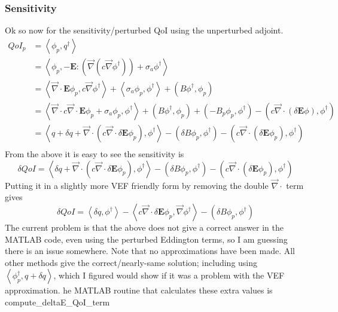 \documentclass{article}
\newcommand{\bra}{\left\langle}
\newcommand{\ket}{\right\rangle}
\newcommand{\vdiv}{\vec{\nabla} \cdot}
\newcommand{\vgrad}{\vec{\nabla}}
\newcommand{\Edd}{\mathbf{E}}
\newcommand{\siga}{\sigma_a}
\newcommand{\isigt}{c}
\newcommand{\scalSource}{q}
\newcommand{\scalResp}{q^\dag}
\newcommand{\qoi}{QoI}
\begin{document}
\subsubsection{Sensitivity}
Ok so now for the sensitivity/perturbed QoI using the unperturbed adjoint. 
\begin{equation}
\begin{split}
\qoi_p&=\bra \phi_p , \scalResp \ket\\
&=\bra \phi_p , - \Edd : \left( \vgrad \left( c \vgrad \phi^\dag \right) \right) + \siga \phi^\dag \ket\\
&=\bra  \vdiv \Edd \phi_p , c \vgrad \phi^\dag  \ket + \bra \siga \phi_p , \phi^\dag \ket + \left( B \phi^\dag , \phi_p \right)\\
&= \bra  \vdiv c \vdiv \Edd \phi_p + \siga \phi_p , \phi^\dag  \ket  + \left( B \phi^\dag , \phi_p \right)+ \left( - B_p \phi_p , \phi^\dag \right) - \left( \isigt   \vec{\nabla} \cdot \left(\delta \Edd \phi \right) , \phi^\dag \right) \\
&= \bra  q + \delta q + \vdiv \left(\isigt\vdiv \delta \Edd \phi_p \right), \phi^\dag  \ket  - \left( \delta B \phi_p , \phi^\dag \right) - \left( \isigt   \vec{\nabla} \cdot \left(\delta \Edd \phi_p \right) , \phi^\dag \right) \\
\end{split}
\end{equation}
From the above it is easy to see the sensitivity is 
\begin{equation}
\delta \qoi = \bra  \delta q + \vdiv \left(\isigt\vdiv \delta \Edd \phi_p \right), \phi^\dag  \ket  - \left( \delta B \phi_p , \phi^\dag \right) - \left( \isigt   \vec{\nabla} \cdot \left(\delta \Edd \phi_p \right) , \phi^\dag \right)
\end{equation}
Putting it in a slightly more VEF friendly form by removing the double $\vdiv$ term gives
\begin{equation}
\delta \qoi = \bra  \delta q , \phi^\dag \ket - \bra  \isigt\vdiv \delta \Edd \phi_p , \vgrad \phi^\dag  \ket  - \left( \delta B \phi_p , \phi^\dag \right) 
\end{equation}
The current problem is that the above does not give a correct answer in the MATLAB code, even using the perturbed Eddington terms, so I am guessing there is an issue somewhere. Note that no approximations have been made. All other methods  give the correct/nearly-same solution; including using $ \bra \phi^\dag_p , \scalSource +\delta \scalSource \ket $, which I figured would show if it was a problem with the VEF approximation. he MATLAB routine that calculates these extra values is compute\_deltaE\_QoI\_term
\end{document}
